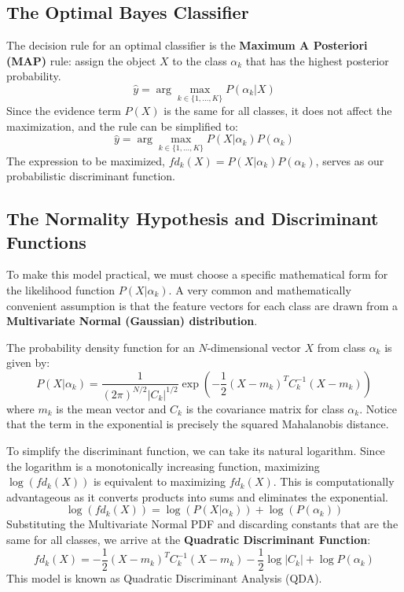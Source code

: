 \subsection*{The Optimal Bayes Classifier}
The decision rule for an optimal classifier is the \textbf{Maximum A Posteriori (MAP)} rule: assign the object $X$ to the class $\alpha_k$ that has the highest posterior probability.
$$ \hat{y} = \arg\max_{k \in \{1, \dots, K\}} P(\alpha_k | X) $$
Since the evidence term $P(X)$ is the same for all classes, it does not affect the maximization, and the rule can be simplified to:
$$ \hat{y} = \arg\max_{k \in \{1, \dots, K\}} P(X | \alpha_k) P(\alpha_k) $$
The expression to be maximized, $fd_k(X) = P(X | \alpha_k) P(\alpha_k)$, serves as our probabilistic discriminant function.

\subsection*{The Normality Hypothesis and Discriminant Functions}
To make this model practical, we must choose a specific mathematical form for the likelihood function $P(X | \alpha_k)$. A very common and mathematically convenient assumption is that the feature vectors for each class are drawn from a \textbf{Multivariate Normal (Gaussian) distribution}.

The probability density function for an $N$-dimensional vector $X$ from class $\alpha_k$ is given by:
$$ P(X | \alpha_k) = \frac{1}{(2\pi)^{N/2} |C_k|^{1/2}} \exp\left(-\frac{1}{2}(X - m_k)^T C_k^{-1} (X - m_k)\right) $$
where $m_k$ is the mean vector and $C_k$ is the covariance matrix for class $\alpha_k$. Notice that the term in the exponential is precisely the squared Mahalanobis distance.

To simplify the discriminant function, we can take its natural logarithm. Since the logarithm is a monotonically increasing function, maximizing $\log(fd_k(X))$ is equivalent to maximizing $fd_k(X)$. This is computationally advantageous as it converts products into sums and eliminates the exponential.
$$ \log(fd_k(X)) = \log(P(X | \alpha_k)) + \log(P(\alpha_k)) $$
Substituting the Multivariate Normal PDF and discarding constants that are the same for all classes, we arrive at the \textbf{Quadratic Discriminant Function}:
$$ fd_k(X) = -\frac{1}{2}(X - m_k)^T C_k^{-1} (X - m_k) - \frac{1}{2}\log|C_k| + \log P(\alpha_k) $$
This model is known as Quadratic Discriminant Analysis (QDA).

